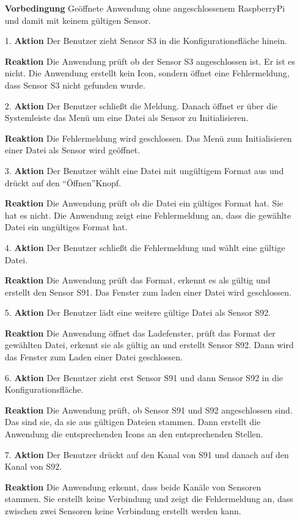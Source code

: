 \documentclass[parskip=full]{scrartcl}
\begin{document}
\begin{itemize}
\begin{itemize}
\item []\textbf{Vorbedingung} Geöffnete Anwendung ohne angeschlossenem RaspberryPi und damit mit keinem gültigen Sensor.
\item [1.]\textbf{Aktion} Der Benutzer zieht Sensor S3 in die Konfigurationsfläche hinein.
\item []\textbf{Reaktion} Die Anwendung prüft ob der Sensor S3 angeschlossen ist. Er ist es nicht. Die Anwendung erstellt kein Icon, sondern öffnet eine Fehlermeldung, dass Sensor S3 nicht gefunden wurde.
\item [2.]\textbf{Aktion} Der Benutzer schließt die Meldung. Danach öffnet er über die Systemleiste das Menü um eine Datei als Sensor zu Initialisieren.
\item []\textbf{Reaktion} Die Fehlermeldung wird geschlossen. Das Menü zum Initialisieren einer Datei als Sensor wird geöffnet.
\item [3.]\textbf{Aktion} Der Benutzer wählt eine Datei mit ungültigem Format aus und drückt auf den "`Öffnen"'Knopf.
\item []\textbf{Reaktion} Die Anwendung prüft ob die Datei ein gültiges Format hat. Sie hat es nicht. Die Anwendung zeigt eine Fehlermeldung an, dass die gewählte Datei ein ungültiges Format hat.
\item [4.]\textbf{Aktion} Der Benutzer schließt die Fehlermeldung und wählt eine gültige Datei.
\item []\textbf{Reaktion} Die Anwendung prüft das Format, erkennt es als gültig und erstellt den Sensor S91. Das Fenster zum laden einer Datei wird geschlossen.
\item [5.]\textbf{Aktion} Der Benutzer lädt eine weitere gültige Datei als Sensor S92.
\item []\textbf{Reaktion} Die Anwendung öffnet das Ladefenster, prüft das Format der gewählten Datei, erkennt sie als gültig an und erstellt Sensor S92. Dann wird das Fenster zum Laden einer Datei geschlossen. 
\item [6.]\textbf{Aktion} Der Benutzer zieht erst Sensor S91 und dann Sensor S92 in die Konfigurationsfläche.
\item []\textbf{Reaktion} Die Anwendung prüft, ob Sensor S91 und S92 angeschlossen sind. Das sind sie, da sie aus gültigen Dateien stammen. Dann erstellt die Anwendung die entsprechenden Icons an den entsprechenden Stellen.
\item [7.]\textbf{Aktion} Der Benutzer drückt auf den Kanal von S91 und danach auf den Kanal von S92.
\item []\textbf{Reaktion} Die Anwendung erkennt, dass beide Kanäle von Sensoren stammen. Sie erstellt keine Verbindung und zeigt die Fehlermeldung an, dass zwischen zwei Sensoren keine Verbindung erstellt werden kann.

\end{itemize}
\end{itemize}
\end{document}

